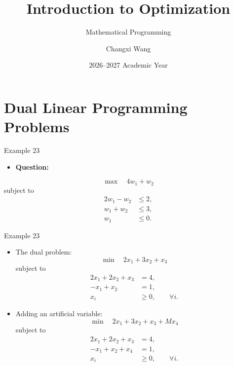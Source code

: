 \documentclass[aspectratio=169,hyperref,UTF8,CJK]{beamer}
\title[Introduction to Optimization]{Introduction to Optimization}
\subtitle{Mathematical Programming}
\author[Changxi Wang]{Changxi Wang}
\institute{Sichuan University-Pittsburgh Institute\\Chengdu, China}
\date{2026--2027 Academic Year}
\begin{document}
\setcounter{framenumber}{160}

\section{Dual Linear Programming Problems}

\begin{frame}{Example 23}
  \begin{itemize}
    \item \textbf{Question:}
  \end{itemize}
  \begin{equation*}
    \max\quad 4w_1+w_2
  \end{equation*}
  subject to
  \begin{align*}
    2w_1-w_2 &\le 2,\\
    w_1+w_2 &\le 3,\\
    w_1 &\le 0.
  \end{align*}
\end{frame}

\begin{frame}{Example 23}
  \small
  \begin{itemize}
    \item The dual problem:
      \begin{equation*}
        \min\quad 2x_1+3x_2+x_3
      \end{equation*}
      subject to
      \begin{align*}
        2x_1+2x_2+x_3 &=4,\\
        -x_1+x_2 &=1,\\
        x_i&\ge0,\qquad\forall i.
      \end{align*}
    \item Adding an artificial variable:
      \begin{equation*}
        \min\quad 2x_1+3x_2+x_3+Mx_4
      \end{equation*}
      subject to
      \begin{align*}
        2x_1+2x_2+x_3 &=4,\\
        -x_1+x_2+x_4 &=1,\\
        x_i&\ge0,\qquad\forall i.
      \end{align*}
  \end{itemize}
\end{frame}
\end{document}

